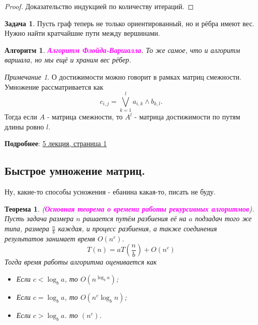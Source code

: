 \documentclass[a4paper]{article}
\theoremstyle{indented}
\newtheorem{theorem}{Теорема}
\newtheorem{alg}{Алгоритм}
\theoremstyle{definition}
\newtheorem{prob}{Задача}
\theoremstyle{remark}
\newtheorem{remark}{Примечание}
\begin{document}
\begin{proof}
    Доказательство индукцией по количеству итераций.
\end{proof}

\begin{prob}
    Пусть граф теперь не только ориентированный, но и рёбра имеют вес. Нужно найти кратчайшие пути между вершинами.
\end{prob}

\begin{alg}
    \textcolor{magenta}{\hypertarget{t24}{\textbf{Алгоритм Флойда-Варшалла}}}. То же самое, что и алгоритм варшала, но мы ещё и храним вес рёбер.
\end{alg}

\begin{remark}
    О достижимости можно говорит в рамках матриц смежности. Умножение рассматривается как 
    \[
        c_{i, j}=\bigvee_{k=1}^l a_{i, k}\wedge b_{k, l}. 
    \]
    Тогда если $A$ - матрица смежности, то $A^l$ - матрица достижимости по путям длины ровно $l$. 
\end{remark}

\textbf{Подробнее}: \href{https://users.math-cs.spbu.ru/~okhotin/teaching/algorithms_2020/okhotin_algorithms_2020_l5.pdf}{5 лекция, страница 1}

\subsection{Быстрое умножение матриц.}

Ну, какие-то способы усножения - ебанина какая-то, писать не буду.

\begin{theorem}
    (\textcolor{magenta}{\hypertarget{t25}{\textbf{Основная теорема о времени работы рекурсивных алгоритмов}}}). Пусть задача размера $n$ рашается путём разбиения её на $a$ подзадач того же типа, размера $\frac{n}{b}$ каждая, и процесс разбиения, а также соединения результатов занимает время $O(n^c)$. 
    \[
        T(n)=aT(\frac{n}{b})+O(n^c)
    \]
    Тогда время работы алгоритма оценивается как

    \begin{itemize}
        \item Если $c<\log_b a$, то $O(n^{\log_b a})$;
        \item Если $c=\log_b a$, то $O(n^c \log_b n )$; 
        \item Если $c>\log_b a$. то $(n^c)$. 
    \end{itemize}
\end{theorem}
\end{document}
